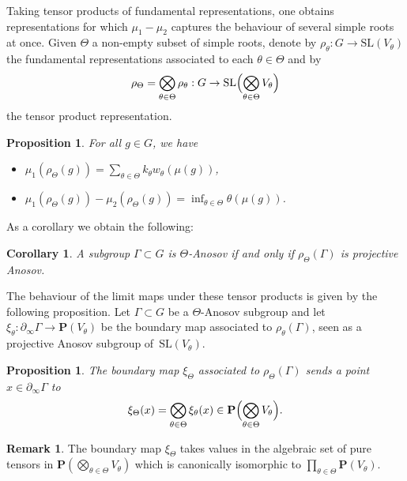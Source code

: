 \documentclass[JEP,XML,SOM,Unicode,NoEqCountersInSection,NoFloatCountersInSection,published]{cedram}
\newtheorem{coro}[theo]{Corollary}
\newtheorem{prop}[theo]{Proposition}
\theoremstyle{definition}
\newtheorem{rmk}[theo]{Remark}
\newcommand{\proj}{\mathbf{P}}
\newcommand{\SL}{\mathrm{SL}}
\let\G\Gamma
\begin{document}
Taking tensor products of fundamental representations, one obtains representations for which $\mu_1- \mu_2$ captures the behaviour of several simple roots at once. Given $\Theta$ a non-empty subset of simple roots, denote by $\rho_\theta: G \to \SL(V_\theta)$ the fundamental representations associated to each $\theta\in \Theta$ and by
\[\rho_\Theta = \bigotimes_{\theta \in \Theta} \rho_\theta : G \to \SL\Bigl( \bigotimes_{\theta \in \Theta} V_\theta\Bigr)\]
the tensor product representation.

\begin{prop} \label{prop - SimpleRootsTensorProduct}
For all $g\in G$, we have
\begin{itemize}
\item $\mu_1(\rho_\Theta(g)) = \sum_{\theta \in \Theta} k_\theta w_\theta(\mu(g))$,
\item $\mu_1(\rho_\Theta(g)) - \mu_2(\rho_\Theta(g)) = \inf_{\theta\in \Theta} \theta(\mu(g))$.
\end{itemize}
\end{prop}

As a corollary we obtain the following:
\begin{coro} \label{coro - anosov is projective anosov}
A subgroup $\G\subset G$ is $\Theta$-Anosov if and only if $\rho_\Theta(\G)$ is projective Anosov.
\end{coro}

The behaviour of the limit maps under these tensor products is given by the following proposition. Let $\G \subset G$ be a $\Theta$-Anosov subgroup and let $\xi_\theta: \partial_\infty \Gamma \to \proj(V_\theta)$ be the boundary map associated to $\rho_\theta(\G)$, seen as a projective Anosov subgroup of~$\SL(V_\theta)$.

\begin{prop} \label{prop - boundary map tensor product}
The boundary map $\xi_\Theta$ associated to $\rho_\Theta(\G)$ sends a point $x\in \partial_\infty \G$ to
\[\xi_\Theta(x) = \bigotimes_{\theta\in \Theta} \xi_\theta(x) \in \proj\Bigl(\bigotimes_{\theta\in \Theta} V_\theta\Bigr).\]
\end{prop}

\begin{rmk}
The boundary map $\xi_\Theta$ takes values in the algebraic set of pure tensors in $\proj\left(\bigotimes_{\theta\in \Theta} V_\theta\right)$ which is canonically isomorphic to $\prod_{\theta \in \Theta} \proj (V_\theta)$.
\end{rmk}
\end{document}
